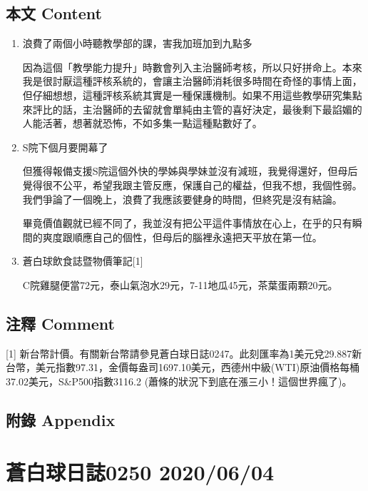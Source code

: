 \documentclass[a5paper, 11pt
]{book}
\begin{document}
\hypertarget{ux672cux6587-content-2}{%
\subsection{本文 Content}\label{ux672cux6587-content-2}}

\begin{enumerate}
\def\labelenumi{\arabic{enumi}.}
\item
  浪費了兩個小時聽教學部的課，害我加班加到九點多

  因為這個「教學能力提升」時數會列入主治醫師考核，所以只好拼命上。本來我是很討厭這種評核系統的，會讓主治醫師消耗很多時間在奇怪的事情上面，但仔細想想，這種評核系統其實是一種保護機制。如果不用這些教學研究集點來評比的話，主治醫師的去留就會單純由主管的喜好決定，最後剩下最諂媚的人能活著，想著就恐怖，不如多集一點這種點數好了。
\item
  S院下個月要開幕了

  但獲得報備支援S院這個外快的學姊與學妹並沒有減班，我覺得還好，但母后覺得很不公平，希望我跟主管反應，保護自己的權益，但我不想，我個性弱。我們爭論了一個晚上，浪費了我應該要健身的時間，但終究是沒有結論。

  畢竟價值觀就已經不同了，我並沒有把公平這件事情放在心上，在乎的只有瞬間的爽度跟順應自己的個性，但母后的腦裡永遠把天平放在第一位。
\item
  蒼白球飲食誌暨物價筆記{[}1{]}

  C院雞腿便當72元，泰山氣泡水29元，7-11地瓜45元，茶葉蛋兩顆20元。
\end{enumerate}

\hypertarget{ux6ce8ux91cb-comment-2}{%
\subsection{注釋 Comment}\label{ux6ce8ux91cb-comment-2}}

{[}1{]}
新台幣計價。有關新台幣請參見蒼白球日誌0247。此刻匯率為1美元兌29.887新台幣，美元指數97.31，金價每盎司1697.10美元，西德州中級(WTI)原油價格每桶37.02美元，S\&P500指數3116.2
(蕭條的狀況下到底在漲三小！這個世界瘋了)。

\hypertarget{ux9644ux9304-appendix-2}{%
\subsection{附錄 Appendix}\label{ux9644ux9304-appendix-2}}

\hypertarget{ux84bcux767dux7403ux65e5ux8a8c0250-20200604}{%
\section{蒼白球日誌0250
2020/06/04}\label{ux84bcux767dux7403ux65e5ux8a8c0250-20200604}}
\end{document}
